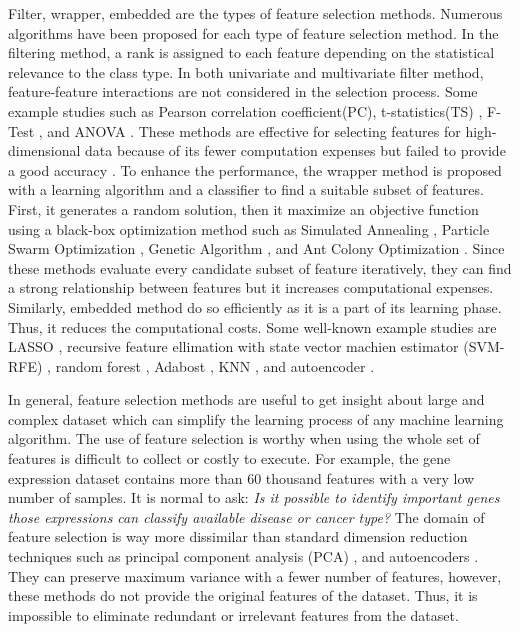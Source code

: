 \documentclass{bioinfo}
\begin{document}
Filter, wrapper, embedded are the types of feature selection methods. Numerous algorithms have been proposed for each type of feature selection method. 
In the filtering method, a rank is assigned to each feature depending on the statistical relevance to the class type. In both univariate and multivariate filter method, feature-feature interactions are not considered in the selection process. Some example studies such as Pearson correlation coefficient(PC), t-statistics(TS) \citep{speed2003statistical}, F-Test , and ANOVA \citep{ding2015identification}. These methods are effective for selecting features for high-dimensional data because of its fewer computation expenses but failed to provide a good accuracy \citep{sun2018cross}. 
To enhance the performance, the wrapper method is proposed with a learning algorithm and a classifier to find a suitable subset of features. First, it generates a random solution, then it maximize an objective function using a black-box optimization method  such as Simulated Annealing \citep{jeong2018feature}, Particle Swarm Optimization \citep{xue2012particle}, Genetic Algorithm \citep{wu2011feature}, and Ant Colony Optimization \citep{kabir2012new}. Since these methods evaluate every candidate subset of feature iteratively, they can find a strong relationship between features but it increases computational expenses. 
Similarly, embedded method do so efficiently as it is a part of its learning phase. Thus, it reduces the computational costs. Some well-known example studies are  LASSO \citep{tibshirani1996regression}, recursive feature ellimation with state vector machien estimator (SVM-RFE) \citep{abdullah2019, guyon2002gene, fang2019tightly}, random forest \citep{pouyan2018random, ram2017classification}, Adabost \citep{wang2012adaboost}, KNN \citep{le2019statistical}, and autoencoder \citep{lu2019autoencoder}.

In general, feature selection methods are useful to get insight about large and complex dataset which can simplify the learning process of any machine learning algorithm. The use of feature selection is worthy when using the whole set of features is difficult to collect or costly to execute. For example, the gene expression dataset contains more than 60 thousand features with a very low number of samples. It is normal to ask: \textit{Is it possible to identify important genes those expressions can classify available disease or cancer type?} The domain of feature selection is way more dissimilar than standard dimension reduction techniques such as principal component analysis (PCA) \citep{hotelling1933analysis}, and autoencoders \citep{hinton2006reducing}. They can preserve maximum variance with a fewer number of features, however, these methods do not provide the original features of the dataset. Thus, it is impossible to eliminate redundant or irrelevant features from the dataset. 
\end{document}
